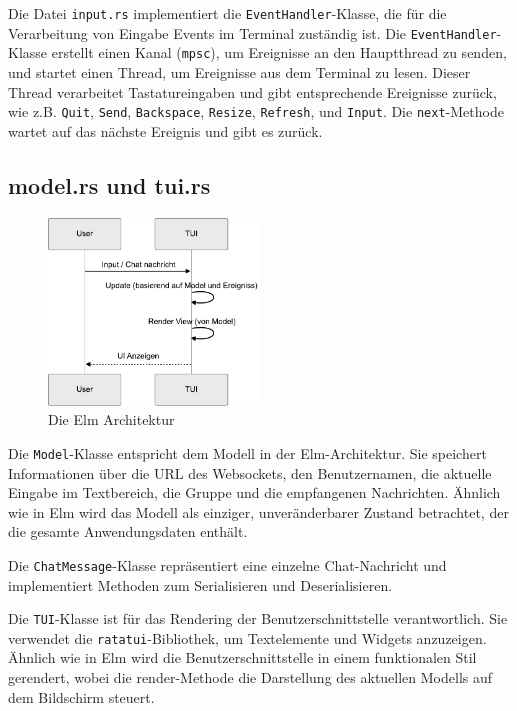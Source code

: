 \documentclass[a4paper]{article}
\begin{document}
Die Datei \texttt{input.rs} implementiert die \texttt{EventHandler}-Klasse, die für die Verarbeitung von Eingabe Events im Terminal zuständig ist.
Die \texttt{EventHandler}-Klasse erstellt einen Kanal (\texttt{mpsc}), um Ereignisse an den Hauptthread zu senden, und startet einen Thread, um Ereignisse aus dem Terminal zu lesen. Dieser Thread verarbeitet Tastatureingaben und gibt entsprechende Ereignisse zurück, wie z.B. \texttt{Quit}, \texttt{Send}, \texttt{Backspace}, \texttt{Resize}, \texttt{Refresh},  und \texttt{Input}. Die \texttt{next}-Methode wartet auf das nächste Ereignis und gibt es zurück.


\subsection{model.rs und tui.rs}

\begin{figure}[hbt]
    \centering
    \includegraphics[width=0.5\textwidth]{ELM.pdf}
    \caption{Die Elm Architektur}\label{fig:elm}
\end{figure}

Die \texttt{Model}-Klasse entspricht dem Modell in der Elm-Architektur. Sie speichert Informationen über die URL des Websockets, den Benutzernamen, die aktuelle Eingabe im Textbereich, die Gruppe und die empfangenen Nachrichten. Ähnlich wie in Elm wird das Modell als einziger, unveränderbarer Zustand betrachtet, der die gesamte Anwendungsdaten enthält.

Die \texttt{ChatMessage}-Klasse repräsentiert eine einzelne Chat-Nachricht und implementiert Methoden zum Serialisieren und Deserialisieren.

Die \texttt{TUI}-Klasse ist für das Rendering der Benutzerschnittstelle verantwortlich. Sie verwendet die \texttt{ratatui}-Bibliothek, um Textelemente und Widgets anzuzeigen. Ähnlich wie in Elm wird die Benutzerschnittstelle in einem funktionalen Stil gerendert, wobei die render-Methode die Darstellung des aktuellen Modells auf dem Bildschirm steuert.
\end{document}
